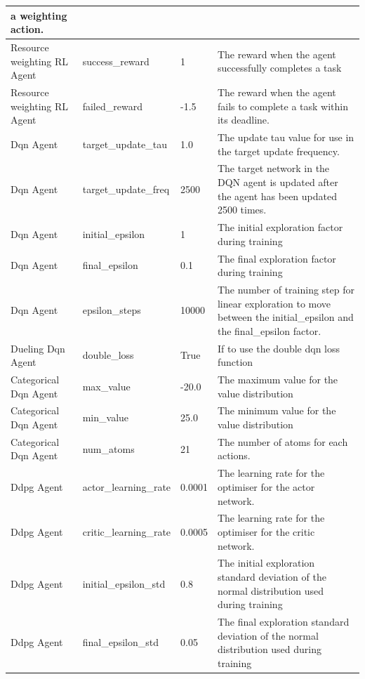 \begin{longtable}{|p{2cm}|p{3.5cm}|p{2.5cm}|p{6cm}|}
            a weighting action. \\ \hline
        Resource weighting RL Agent & success\_reward & 1 & The reward when the agent successfully completes a task
            \\ \hline
        Resource weighting RL Agent & failed\_reward & -1.5 & The reward when the agent fails to complete a task within
            its deadline. \\ \hline
        Dqn Agent & target\_update\_tau & 1.0 & The update tau value for use in the target update frequency. \\ \hline
        Dqn Agent & target\_update\_freq & 2500 & The target network in the DQN agent is updated after the agent
            has been updated 2500 times. \\ \hline
        Dqn Agent & initial\_epsilon & 1 & The initial exploration factor during training \\ \hline
        Dqn Agent & final\_epsilon & 0.1 & The final exploration factor during training \\ \hline
        Dqn Agent & epsilon\_steps & 10000 & The number of training step for linear exploration to move between the
            initial\_epsilon and the final\_epsilon factor. \\ \hline
        Dueling Dqn Agent & double\_loss & True & If to use the double dqn loss function \\ \hline
        Categorical Dqn Agent & max\_value & -20.0 & The maximum value for the value distribution \\ \hline
        Categorical Dqn Agent & min\_value & 25.0 & The minimum value for the value distribution \\ \hline
        Categorical Dqn Agent & num\_atoms & 21 & The number of atoms for each actions. \\ \hline
        Ddpg Agent & actor\_learning\_rate & 0.0001 & The learning rate for the optimiser for the actor network. \\ \hline
        Ddpg Agent & critic\_learning\_rate & 0.0005 & The learning rate for the optimiser for the critic network. \\ \hline
        Ddpg Agent & initial\_epsilon\_std & 0.8 & The initial exploration standard deviation of the normal distribution
            used  during training \\ \hline
        Ddpg Agent & final\_epsilon\_std & 0.05 & The final exploration standard deviation of the normal distribution
            used  during training \\ \hline

\end{longtable}
